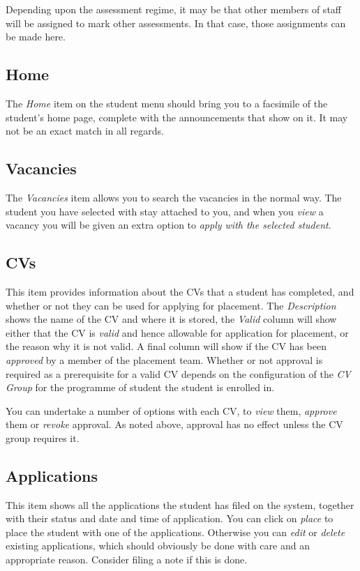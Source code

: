 \documentclass[12 pt]{book}
\begin{document}
Depending upon the assessment regime, it may be that other members of staff will
be assigned to mark other assessments. In that case, those assignments can be
made here.

\subsection{Home}

The \emph{Home} item on the student menu should bring you to a facsimile of the
student's home page, complete with the announcements that show on it. It may
not be an exact match in all regards.

\subsection{Vacancies}

The \emph{Vacancies} item allows you to search the vacancies in the normal way.
The student you have selected with stay attached to you, and when you
\emph{view} a vacancy you will be given an extra option to \emph{apply with
the selected student}.

\subsection{CVs}

This item provides information about the CVs that a student has completed, and
whether or not they can be used for applying for placement. The 
\emph{Description} shows the name of the CV and where it is stored, the 
\emph{Valid} column will show either that the CV is \emph{valid} and hence
allowable for application for placement, or the reason why it is not valid. A
final column will show if the CV has been \emph{approved} by a member of the
placement team. Whether or not approval is required as a prerequisite for a
valid CV depends on the configuration of the \emph{CV Group} for the programme
of student the student is enrolled in.

You can undertake a number of options with each CV, to \emph{view} them, 
\emph{approve} them or \emph{revoke} approval. As noted above, approval has
no effect unless the CV group requires it.

\subsection{Applications}

This item shows all the applications the student has filed on the system, 
together with their status and date and time of application. You can click on
\emph{place} to place the student with one of the applications. Otherwise you
can \emph{edit} or \emph{delete} existing applications, which should obviously
be done with care and an appropriate reason. Consider filing a note if this is
done.
\end{document}
